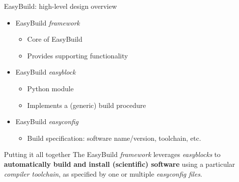 \documentclass[10pt,xcolor={usenames,dvipsnames}]{beamer}
\begin{document}

\begin{frame}{EasyBuild: high-level design overview}
\begin{itemize}
    \item
        EasyBuild \emph{framework}
        \begin{itemize}
            \item
                Core of EasyBuild
            \item
                Provides supporting functionality
        \end{itemize}
    \item
        EasyBuild \emph{easyblock}
        \begin{itemize}
            \item
                Python module
            \item
                Implements a (generic) build procedure
        \end{itemize}
    \item
        EasyBuild \emph{easyconfig}
        \begin{itemize}
            \item
                Build specification: software name/version, toolchain, etc.
        \end{itemize}
\end{itemize}

\medskip\quad\quad
\begin{minipage}{0.9\textwidth}
    \begin{block}{Putting it all together}
        The EasyBuild \emph{framework} leverages \emph{easyblocks} to
        \textbf{automatically build and install (scientific) software} using a
        particular \emph{compiler toolchain}, as specified by one or multiple
        \emph{easyconfig files}.
    \end{block}
\end{minipage}
\end{frame}

\end{document}
